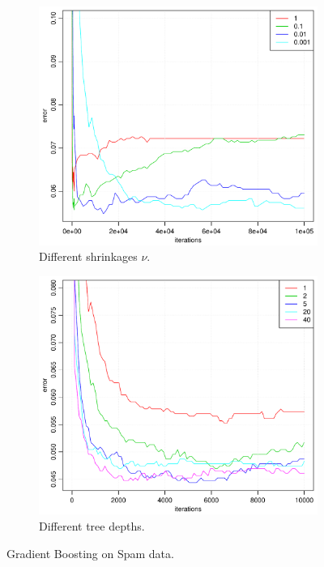 \begin{figure}[htbp]
  \centering
  \begin{subfigure}[b]{0.48\textwidth}
    \includegraphics[width=\textwidth]{./figures/gradboostSpamShrink2.pdf}
    \caption{Different shrinkages $\nu$.}
    \label{fig:gradboostSpamShrink2}
  \end{subfigure}%
  \quad
  \begin{subfigure}[b]{0.48\textwidth}
    \includegraphics[width=\textwidth]{./figures/gradboostSpamDepth.pdf}
    \caption{Different tree depths.}
    \label{fig:gradboostSpamDepth}
  \end{subfigure}
  \vspace{1\baselineskip}
  \caption{Gradient Boosting on Spam data.}
  \label{fig:GradBoostSpam}
\end{figure}

